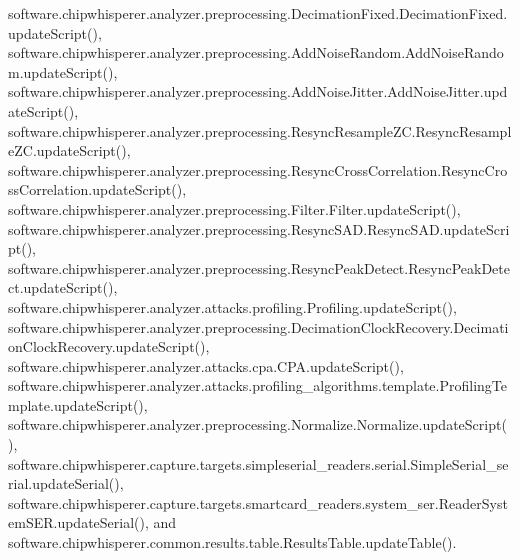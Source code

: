 software.\+chipwhisperer.\+analyzer.\+preprocessing.\+Decimation\+Fixed.\+Decimation\+Fixed.\+update\+Script(), software.\+chipwhisperer.\+analyzer.\+preprocessing.\+Add\+Noise\+Random.\+Add\+Noise\+Random.\+update\+Script(), software.\+chipwhisperer.\+analyzer.\+preprocessing.\+Add\+Noise\+Jitter.\+Add\+Noise\+Jitter.\+update\+Script(), software.\+chipwhisperer.\+analyzer.\+preprocessing.\+Resync\+Resample\+Z\+C.\+Resync\+Resample\+Z\+C.\+update\+Script(), software.\+chipwhisperer.\+analyzer.\+preprocessing.\+Resync\+Cross\+Correlation.\+Resync\+Cross\+Correlation.\+update\+Script(), software.\+chipwhisperer.\+analyzer.\+preprocessing.\+Filter.\+Filter.\+update\+Script(), software.\+chipwhisperer.\+analyzer.\+preprocessing.\+Resync\+S\+A\+D.\+Resync\+S\+A\+D.\+update\+Script(), software.\+chipwhisperer.\+analyzer.\+preprocessing.\+Resync\+Peak\+Detect.\+Resync\+Peak\+Detect.\+update\+Script(), software.\+chipwhisperer.\+analyzer.\+attacks.\+profiling.\+Profiling.\+update\+Script(), software.\+chipwhisperer.\+analyzer.\+preprocessing.\+Decimation\+Clock\+Recovery.\+Decimation\+Clock\+Recovery.\+update\+Script(), software.\+chipwhisperer.\+analyzer.\+attacks.\+cpa.\+C\+P\+A.\+update\+Script(), software.\+chipwhisperer.\+analyzer.\+attacks.\+profiling\+\_\+algorithms.\+template.\+Profiling\+Template.\+update\+Script(), software.\+chipwhisperer.\+analyzer.\+preprocessing.\+Normalize.\+Normalize.\+update\+Script(), software.\+chipwhisperer.\+capture.\+targets.\+simpleserial\+\_\+readers.\+serial.\+Simple\+Serial\+\_\+serial.\+update\+Serial(), software.\+chipwhisperer.\+capture.\+targets.\+smartcard\+\_\+readers.\+system\+\_\+ser.\+Reader\+System\+S\+E\+R.\+update\+Serial(), and software.\+chipwhisperer.\+common.\+results.\+table.\+Results\+Table.\+update\+Table().


